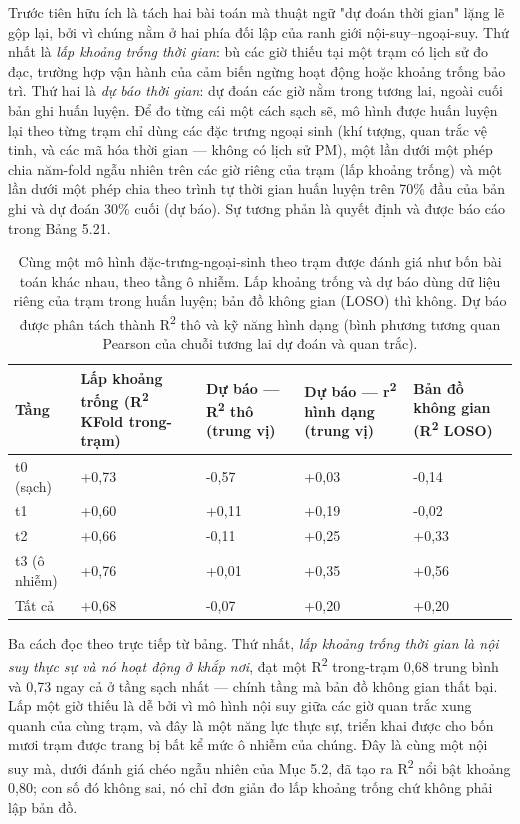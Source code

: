 Trước tiên hữu ích là tách hai bài toán mà thuật ngữ "dự đoán thời gian" lặng lẽ gộp lại, bởi vì chúng nằm ở hai phía đối lập của ranh giới nội-suy--ngoại-suy. Thứ nhất là \emph{lấp khoảng trống thời gian}: bù các giờ thiếu tại một trạm có lịch sử đo đạc, trường hợp vận hành của cảm biến ngừng hoạt động hoặc khoảng trống bảo trì. Thứ hai là \emph{dự báo thời gian}: dự đoán các giờ nằm trong tương lai, ngoài cuối bản ghi huấn luyện. Để đo từng cái một cách sạch sẽ, mô hình được huấn luyện lại theo từng trạm chỉ dùng các đặc trưng ngoại sinh (khí tượng, quan trắc vệ tinh, và các mã hóa thời gian --- không có lịch sử PM), một lần dưới một phép chia năm-fold ngẫu nhiên trên các giờ riêng của trạm (lấp khoảng trống) và một lần dưới một phép chia theo trình tự thời gian huấn luyện trên 70\% đầu của bản ghi và dự đoán 30\% cuối (dự báo). Sự tương phản là quyết định và được báo cáo trong Bảng 5.21.

{\small
\begin{longtable}{lllll}
\caption{Cùng một mô hình đặc-trưng-ngoại-sinh theo trạm được đánh giá như bốn bài toán khác nhau, theo tầng ô nhiễm. Lấp khoảng trống và dự báo dùng dữ liệu riêng của trạm trong huấn luyện; bản đồ không gian (LOSO) thì không. Dự báo được phân tách thành R\textsuperscript{2} thô và kỹ năng hình dạng (bình phương tương quan Pearson của chuỗi tương lai dự đoán và quan trắc).}\\
\toprule
\textbf{Tầng} & \textbf{Lấp khoảng trống (R\textsuperscript{2} KFold trong-trạm)} & \textbf{Dự báo --- R\textsuperscript{2} thô (trung vị)} & \textbf{Dự báo --- r\textsuperscript{2} hình dạng (trung vị)} & \textbf{Bản đồ không gian (R\textsuperscript{2} LOSO)} \\
\midrule\endhead
t0 (sạch) & +0,73 & -0,57 & +0,03 & -0,14 \\
t1 & +0,60 & +0,11 & +0,19 & -0,02 \\
t2 & +0,66 & -0,11 & +0,25 & +0,33 \\
t3 (ô nhiễm) & +0,76 & +0,01 & +0,35 & +0,56 \\
Tất cả & +0,68 & -0,07 & +0,20 & +0,20 \\
\bottomrule
\end{longtable}
}


Ba cách đọc theo trực tiếp từ bảng. Thứ nhất, \emph{lấp khoảng trống thời gian là nội suy thực sự và nó hoạt động ở khắp nơi}, đạt một R\textsuperscript{2} trong-trạm 0,68 trung bình và 0,73 ngay cả ở tầng sạch nhất --- chính tầng mà bản đồ không gian thất bại. Lấp một giờ thiếu là dễ bởi vì mô hình nội suy giữa các giờ quan trắc xung quanh của cùng trạm, và đây là một năng lực thực sự, triển khai được cho bốn mươi trạm được trang bị bất kể mức ô nhiễm của chúng. Đây là cùng một nội suy mà, dưới đánh giá chéo ngẫu nhiên của Mục 5.2, đã tạo ra R\textsuperscript{2} nổi bật khoảng 0,80; con số đó không sai, nó chỉ đơn giản đo lấp khoảng trống chứ không phải lập bản đồ.

